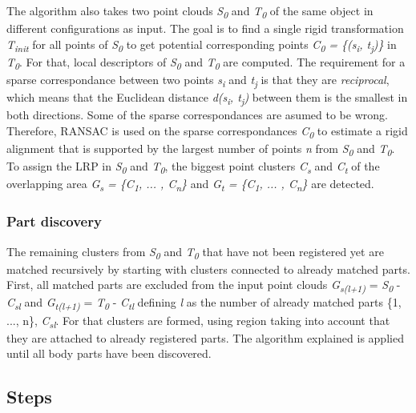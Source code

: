 \documentclass[a4paper,english,11pt]{report}
\begin{document}
The algorithm also takes two point clouds \textit{S\textsubscript{0}} and \textit{T\textsubscript{0}} of the same object in different configurations as input.
The goal is to find a single rigid transformation \textit{T\textsubscript{init}} for all points of \textit{S\textsubscript{0}} to get potential corresponding points \textit{C\textsubscript{0} = \{(s\textsubscript{i}, t\textsubscript{j})\}} in \textit{T\textsubscript{0}}. For that, local descriptors of \textit{S\textsubscript{0}} and \textit{T\textsubscript{0}} are computed. The requirement for a sparse correspondance between two points \textit{s\textsubscript{i}} and \textit{t\textsubscript{j}}  is that they are \textit{reciprocal}, which means that the Euclidean distance \textit{d(s\textsubscript{i}, t\textsubscript{j})} between them is the smallest in both directions. Some of the sparse correspondances are asumed to be wrong. Therefore, RANSAC is used on the sparse correspondances \textit{C\textsubscript{0}} to estimate a rigid alignment that is supported by the largest number of points \textit{n} from \textit{S\textsubscript{0}} and \textit{T\textsubscript{0}}. To assign the LRP in \textit{S\textsubscript{0}} and \textit{T\textsubscript{0}}, the biggest point clusters \textit{C\textsubscript{s}} and \textit{C\textsubscript{t}} of the overlapping area \textit{G\textsubscript{s} = \{C\textsubscript{1}, ... , C\textsubscript{n}\} } and \textit{G\textsubscript{t} = \{C\textsubscript{1}, ... , C\textsubscript{n}\} } are detected. 


\subsubsection{Part discovery}

The remaining clusters from \textit{S\textsubscript{0}} and \textit{T\textsubscript{0}} that have not been registered yet are matched recursively by starting with clusters connected to already matched parts. First, all matched parts are excluded from the input point clouds  \textit{G\textsubscript{s(l+1)}} = \textit{S\textsubscript{0}} - \textit{C\textsubscript{sl}} and \textit{G\textsubscript{t(l+1)}} = \textit{T\textsubscript{0}} - \textit{C\textsubscript{tl}} defining \textit{l} as the number of already matched parts \{1, ..., n\}, \textit{C\textsubscript{sl}}. For that clusters are formed, using region taking into account that they are attached to already registered parts. The algorithm explained is applied until all body parts have been discovered.

\subsection{Steps}
\end{document}
